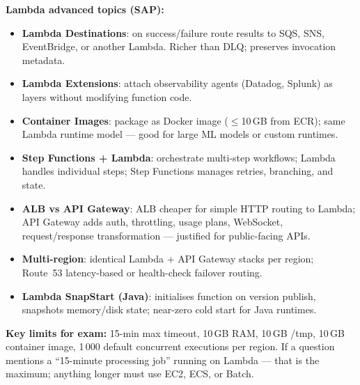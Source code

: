 \begin{sapdepth}
\textbf{Lambda advanced topics (SAP):}
\begin{itemize}
  \item \textbf{Lambda Destinations}: on success/failure route results to SQS, SNS,
        EventBridge, or another Lambda. Richer than DLQ; preserves invocation metadata.
  \item \textbf{Lambda Extensions}: attach observability agents (Datadog, Splunk) as
        layers without modifying function code.
  \item \textbf{Container Images}: package as Docker image ($\leq$10\,GB from ECR);
        same Lambda runtime model --- good for large ML models or custom runtimes.
  \item \textbf{Step Functions + Lambda}: orchestrate multi-step workflows; Lambda
        handles individual steps; Step Functions manages retries, branching, and state.
  \item \textbf{ALB vs API Gateway}: ALB cheaper for simple HTTP routing to Lambda;
        API Gateway adds auth, throttling, usage plans, WebSocket, request/response
        transformation --- justified for public-facing APIs.
  \item \textbf{Multi-region}: identical Lambda + API Gateway stacks per region;
        Route~53 latency-based or health-check failover routing.
  \item \textbf{Lambda SnapStart (Java)}: initialises function on version publish,
        snapshots memory/disk state; near-zero cold start for Java runtimes.
\end{itemize}
\end{sapdepth}

\begin{examtip}
\textbf{Key limits for exam:} 15-min max timeout, 10\,GB RAM, 10\,GB /tmp,
10\,GB container image, 1\,000 default concurrent executions per region.
If a question mentions a ``15-minute processing job'' running on Lambda ---
that is the maximum; anything longer must use EC2, ECS, or Batch.
\end{examtip}
